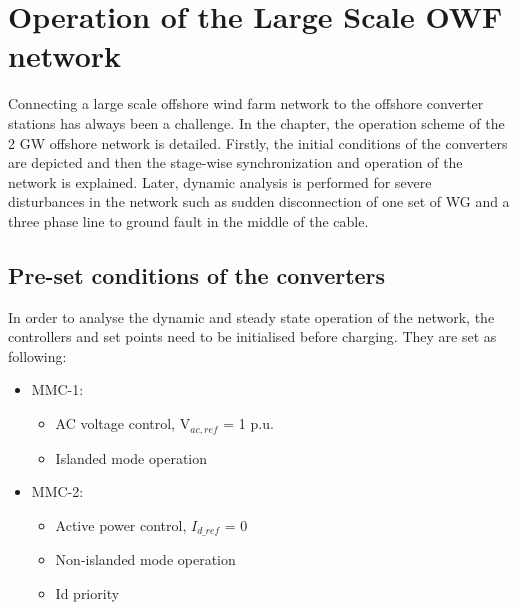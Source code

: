 \chapter{Operation of the Large Scale OWF network}\label{5}
Connecting a large scale offshore wind farm network to the offshore converter stations has always been a challenge. In the chapter, the operation scheme of the 2 GW offshore network is detailed. Firstly, the initial conditions of the converters are depicted and then the stage-wise synchronization and operation of the network is explained. Later, dynamic analysis is performed for severe disturbances in the network such as sudden disconnection of one set of \gls{WG} and a three phase line to ground fault in the middle of the cable.

\section{Pre-set conditions of the converters}
In order to analyse the dynamic and steady state operation of the network, the controllers and set points need to be initialised before charging. They are set as following:

\begin{itemize}
    \item \gls{MMC}-1:
    \begin{itemize}
        \item \gls{AC} voltage control, V$_{ac,ref}$ = 1 p.u.
        \item Islanded mode operation
    \end{itemize}
\end{itemize}

\begin{itemize}
    \item \gls{MMC}-2:
    \begin{itemize}
        \item Active power control, $I_{d\_ref}$ = 0
        \item Non-islanded mode operation
        \item Id priority
    \end{itemize}
\end{itemize}

